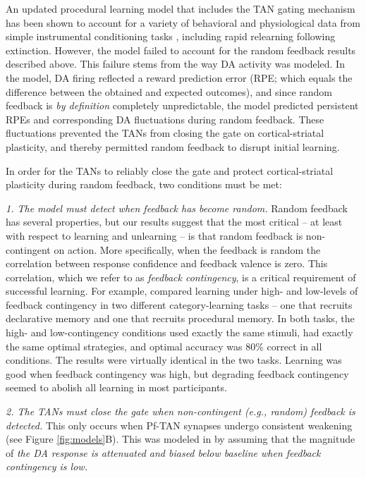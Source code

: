 \documentclass[man,apacite,draftfirst]{apa6}
\begin{document}
An updated procedural learning model that includes the TAN gating mechanism has
been shown to account for a variety of behavioral and physiological data from
simple instrumental conditioning tasks
\cite{ashby_computational_2011, crossley_expanding_2016}, including rapid
relearning following extinction. However, the model failed to account for the
random feedback results described above. This failure stems from the way DA
activity was modeled. In the model, DA firing reflected a reward prediction error
(RPE; which equals the difference between the obtained and expected outcomes), and since
random feedback is \emph{by definition} completely unpredictable, the model predicted 
persistent RPEs and corresponding DA fluctuations during random feedback. These
fluctuations prevented the TANs from closing the gate on cortical-striatal
plasticity, and thereby permitted random feedback to disrupt initial learning.

In order for the TANs to reliably close the gate and protect cortical-striatal
plasticity during random feedback, two conditions must be met:

\begin{description}
\item \textit{1. The model must detect when feedback has become random.} Random
  feedback has several properties, but our results suggest that the most critical -- at least with respect to learning and unlearning -- is that random feedback is non-contingent on action. More specifically, when the feedback is random the correlation between response confidence and feedback valence is zero. This correlation, which we refer to as \textit{feedback contingency}, is a critical requirement of successful learning. For example,  compared learning under high- and low-levels of feedback contingency in two different category-learning tasks -- one that recruits declarative memory and one that recruits procedural memory. In both tasks, the high- and low-contingency conditions used exactly the same stimuli, had exactly the same optimal strategies, and optimal accuracy was 80\% correct in all conditions. The results were virtually identical in the two tasks. Learning was good when feedback contingency was high, but degrading feedback contingency seemed to abolish all learning in most participants.

\item \textit{2. The TANs must close the gate when non-contingent (e.g., random) feedback is detected.} This only occurs when Pf-TAN synapses undergo consistent weakening (see Figure \ref{fig:models}B). This was modeled in \cite{crossley_erasing_2013} by assuming that the magnitude of \textit{the DA response is attenuated and biased below baseline when feedback contingency is low.}
\end{description}
\end{document}
